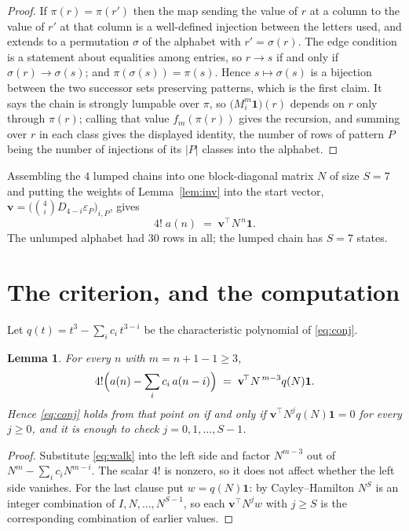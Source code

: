 \documentclass[11pt,a4paper]{article}
\theoremstyle{plain}
\newtheorem{lemma}[theorem]{Lemma}
\theoremstyle{definition}
\begin{document}
\begin{proof}
If $\pi(r)=\pi(r')$ then the map sending the value of $r$ at a column to the value of $r'$
at that column is a well-defined injection between the letters used, and extends to a
permutation $\sigma$ of the alphabet with $r'=\sigma(r)$. The edge condition is a statement
about equalities among entries, so $r\to s$ if and only if $\sigma(r)\to\sigma(s)$; and
$\pi(\sigma(s))=\pi(s)$. Hence $s\mapsto\sigma(s)$ is a bijection between the two successor
sets preserving patterns, which is the first claim. It says the chain is strongly lumpable
over $\pi$, so $\bigl(M_i^{m}\mathbf{1}\bigr)(r)$ depends on $r$ only through $\pi(r)$;
calling that value $f_m(\pi(r))$ gives the recursion, and summing over $r$ in each class
gives the displayed identity, the number of rows of pattern $P$ being the number of
injections of its $|P|$ classes into the alphabet.
\end{proof}

Assembling the $4$ lumped chains into one block-diagonal matrix $N$ of size $S=7$ and
putting the weights of Lemma~\ref{lem:inv} into the start vector,
$\mathbf{v}=\bigl(\binom{4}{i}D_{4-i}\varepsilon_P\bigr)_{i,P}$, gives
\begin{equation}\label{eq:walk}
4!\;a(n)\;=\;\mathbf{v}^{\!\top}N^{\,n}\mathbf{1} .
\end{equation}
The unlumped alphabet had $30$ rows in all; the lumped chain has $S=7$ states.

\section{The criterion, and the computation}

Let $q(t)=t^{3}-\sum_i c_i\,t^{3-i}$ be the characteristic polynomial of
\eqref{eq:conj}.

\begin{lemma}\label{lem:crit}
For every $n$ with $m=n+1-1\ge3$,
\[
4!\Bigl(a(n)-\sum_i c_i\,a(n-i)\Bigr)\;=\;\mathbf{v}^{\!\top}N^{\,m-3}q(N)\mathbf{1} .
\]
Hence \eqref{eq:conj} holds from that point on if and only if
$\mathbf{v}^{\!\top}N^{j}q(N)\mathbf{1}=0$ for every $j\ge0$, and it is enough to check
$j=0,1,\dots,S-1$.
\end{lemma}

\begin{proof}
Substitute \eqref{eq:walk} into the left side and factor $N^{m-3}$ out of
$N^{m}-\sum_i c_iN^{m-i}$. The scalar $4!$ is nonzero, so it does not affect whether
the left side vanishes. For the last clause put $w=q(N)\mathbf{1}$: by Cayley--Hamilton
$N^{S}$ is an integer combination of $I,N,\dots,N^{S-1}$, so each
$\mathbf{v}^{\!\top}N^{j}w$ with $j\ge S$ is the corresponding combination of earlier
values.
\end{proof}
\end{document}
